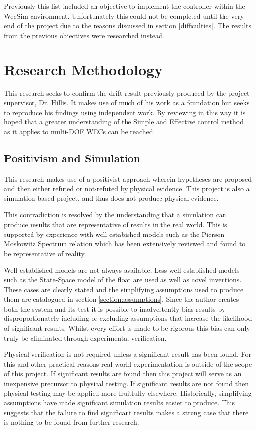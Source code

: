 \documentclass{report}
\begin{document}
Previously this list included an objective to implement the controller within the WecSim environment. Unfortunately this could not be completed until the very end of the project due to the reasons discussed in section \ref{difficulties}. The results from the previous objectives were researched instead.

\chapter{Research Methodology}
This research seeks to confirm the drift result previously produced by the project supervisor, Dr. Hillis. It makes use of much of his work as a foundation but seeks to reproduce his findings using independent work. By reviewing in this way it is hoped that a greater understanding of the Simple and Effective control method as it applies to multi-DOF WECs can be reached.

\section{Positivism and Simulation}
This research makes use of a positivist approach wherein hypotheses are proposed and then either refuted or not-refuted by physical evidence. This project is also a simulation-based project, and thus does not produce physical evidence.

This contradiction is resolved by the understanding that a simulation can produce results that are representative of results in the real world. This is supported by experience with well-estabished models such as the Pierson-Moskowitz Spectrum relation\cite{OGPM} which has been extensively reviewed\cite{PMReview} and found to be representative of reality. 

Well-established models are not always available. Less well established models such as the State-Space model of the float \cite{andyMPC} are used as well as novel inventions. These cases are clearly stated and the simplifying assumptions used to produce them are catalogued in section \ref{section:assumptions}. Since the author creates both the system and its test it is possible to inadvertently bias results by disproportionately including or excluding assumptions that increase the likelihood of significant results. Whilst every effort is made to be rigorous this bias can only truly be eliminated through experimental verification.

Physical verification is not required unless a significant result has been found. For this and other practical reasons real world experimentation is outside of the scope of this project. If significant results are found then this project will serve as an inexpensive precursor to physical testing. If significant results are not found then physical testing may be applied more fruitfully elsewhere. Historically, simplifying assumptions have made significant simulation results easier to produce\cite{PMReview}. This suggests that the failure to find significant results makes a strong case that there is nothing to be found from further research.
\end{document}

